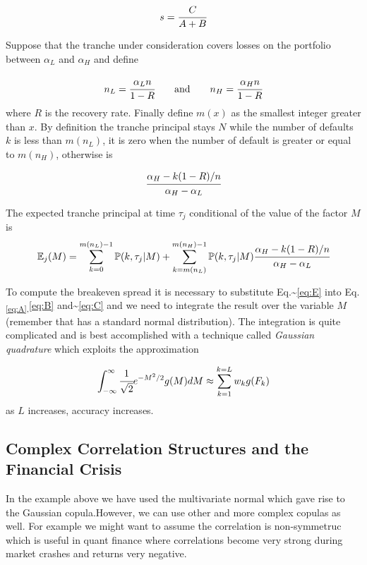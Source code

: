 \documentclass[11pt]{article}
\begin{document}
\[ s = \cfrac{C}{A+B}\]

Suppose that the tranche under consideration covers losses on the
portfolio between \(\alpha_L\) and \(\alpha_H\) and define

\[n_L = \cfrac{\alpha_L n}{1-R}\qquad \mathrm{and}\qquad n_H = \cfrac{\alpha_H n}{1-R}\]
where \(R\) is the recovery rate. Finally define \(m(x)\) as the
smallest integer greater than \(x\). By definition the tranche principal
stays \(N\) while the number of defaults \(k\) is less than \(m(n_L)\),
it is zero when the number of default is greater or equal to \(m(n_H)\),
otherwise is

\[\cfrac{\alpha_H -k(1-R)/n}{\alpha_H - \alpha_L}\]

The expected tranche principal at time \(\tau_j\) conditional of the
value of the factor \(M\) is \[\begin{equation}
\mathbb{E}_j(M) = \sum_{k=0}^{m(n_L)-1}\mathbb{P}(k, \tau_j|M) + \sum_{k=m(n_L)}^{m(n_H)-1}\mathbb{P}(k, \tau_j|M) \cfrac{\alpha_H -k(1-R)/n}{\alpha_H - \alpha_L}
\label{eq:E}
\end{equation}
\]

To compute the breakeven spread it is necessary to substitute
Eq.\textasciitilde{}\ref{eq:E} into
Eq.\textsubscript{\ref{eq:A},}\ref{eq:B} and\textasciitilde{}\ref{eq:C}
and we need to integrate the result over the variable \(M\) (remember
that has a standard normal distribution). The integration is quite
complicated and is best accomplished with a technique called
\emph{Gaussian quadrature} which exploits the approximation

\[\int_{-\infty}^{\infty}{\cfrac{1}{\sqrt{2}}e^{-M^{2}/2}g(M)dM} \approx \sum_{k=1}^{k=L}w_k g(F_k)\]
as \(L\) increases, accuracy increases.

    \hypertarget{complex-correlation-structures-and-the-financial-crisis}{%
\subsection{Complex Correlation Structures and the Financial
Crisis}\label{complex-correlation-structures-and-the-financial-crisis}}

In the example above we have used the multivariate normal which gave
rise to the Gaussian copula.However, we can use other and more complex
copulas as well. For example we might want to assume the correlation is
non-symmetruc which is useful in quant finance where correlations become
very strong during market crashes and returns very negative.
\end{document}
